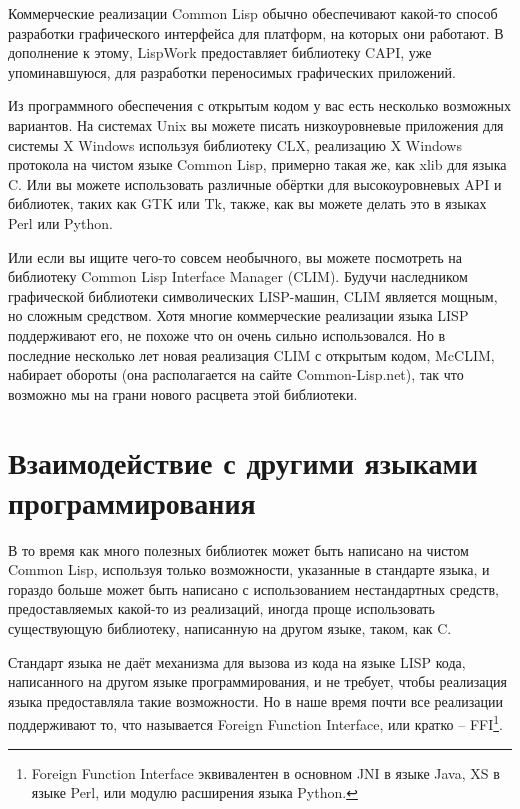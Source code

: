 Коммерческие реализации Common Lisp обычно обеспечивают какой-то способ разработки
графического интерфейса для платформ, на которых они работают. В дополнение к этому,
LispWork предоставляет библиотеку CAPI, уже упоминавшуюся, для разработки переносимых
графических приложений.

Из программного обеспечения с открытым кодом у вас есть несколько возможных вариантов. На
системах Unix вы можете писать низкоуровневые приложения для системы X Windows используя
библиотеку CLX, реализацию X Windows протокола на чистом языке Common Lisp, примерно такая
же, как xlib для языка C. Или вы можете использовать различные обёртки для высокоуровневых
API и библиотек, таких как GTK или Tk, также, как вы можете делать это в языках Perl или
Python.

Или если вы ищите чего-то совсем необычного, вы можете посмотреть на библиотеку Common
Lisp Interface Manager (CLIM). Будучи наследником графической библиотеки символических
LISP-машин, CLIM является мощным, но сложным средством. Хотя многие коммерческие
реализации языка LISP поддерживают его, не похоже что он очень сильно использовался. Но в
последние несколько лет новая реализация CLIM с открытым кодом, McCLIM, набирает обороты
(она располагается на сайте Common-Lisp.net), так что возможно мы на грани нового расцвета
этой библиотеки.

\section{Взаимодействие с другими языками программирования}

В то время как много полезных библиотек может быть написано на чистом Common Lisp,
используя только возможности, указанные в стандарте языка, и гораздо больше может быть
написано с использованием нестандартных средств, предоставляемых какой-то из реализаций,
иногда проще использовать существующую библиотеку, написанную на другом языке, таком, как
C.

Стандарт языка не даёт механизма для вызова из кода на языке LISP кода, написанного на
другом языке программирования, и не требует, чтобы реализация языка предоставляла такие
возможности. Но в наше время почти все реализации поддерживают то, что называется Foreign
Function Interface, или кратко -- FFI\footnote{Foreign Function Interface эквивалентен в
  основном JNI в языке Java, XS в языке Perl, или модулю расширения языка Python.}.

